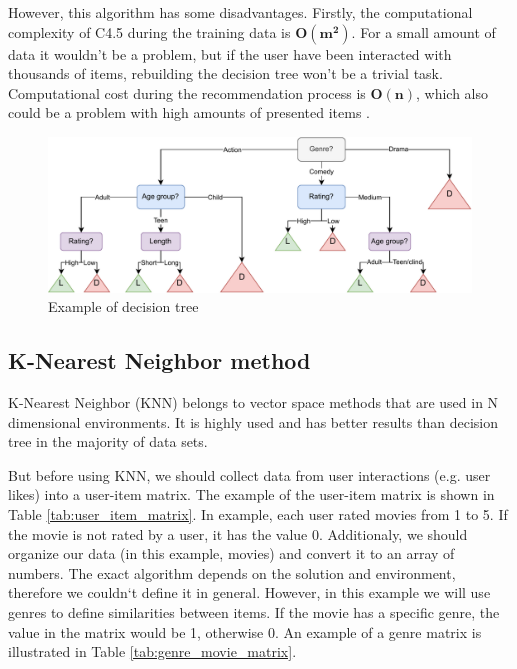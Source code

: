 However, this algorithm has some disadvantages. Firstly, the computational complexity of C4.5 during the training data is $\mathbf{O(m^2)}$. For a small amount of data it wouldn't be a problem, but if the user have been interacted with thousands of items, rebuilding the decision tree won't be a trivial task. Computational cost during the recommendation process is $\mathbf{O(n)}$, which also could be a problem with high amounts of presented items \cite{Decision_Tree}.
\begin{center}
    \begin{figure}[H]
    \includegraphics[width=\textwidth]{figures/diagrams/article_decision_tree_colored.pdf}
    \caption{Example of decision tree}
    \label{fig:decision_tree}
    \end{figure}
\end{center}

\subsection{K-Nearest Neighbor method}
K-Nearest Neighbor (KNN) belongs to vector space methods that are used in N dimensional environments. It is highly used and has better results than decision tree in the majority of data sets\cite{KNN}.

But before using KNN, we should collect data from user interactions (e.g. user likes) into a user-item matrix. The example of the user-item matrix is shown in Table \ref{tab:user_item_matrix}. In example, each user rated movies from 1 to 5. If the movie is not rated by a user, it has the value 0. Additionaly, we should organize our data (in this example, movies) and convert it to an array of numbers. The exact  algorithm depends on the solution and environment, therefore we couldn`t define it in general. However, in this example we will use genres to define similarities between items. If the movie has a specific genre, the value in the matrix would be 1, otherwise 0. An example of a genre matrix is illustrated in Table \ref{tab:genre_movie_matrix}.

